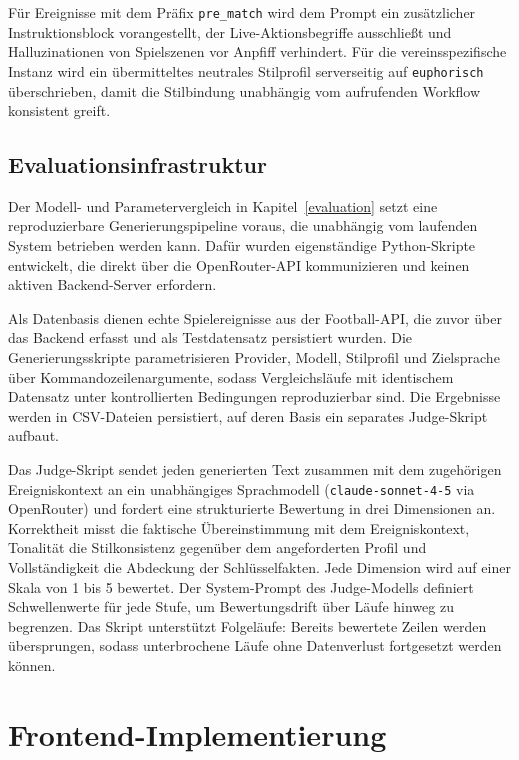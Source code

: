 Für Ereignisse mit dem Präfix \texttt{pre\_match} wird dem Prompt ein zusätzlicher Instruktionsblock vorangestellt, der Live-Aktionsbegriffe ausschließt und Halluzinationen von Spielszenen vor Anpfiff verhindert. Für die vereinsspezifische Instanz wird ein übermitteltes neutrales Stilprofil serverseitig auf \texttt{euphorisch} überschrieben, damit die Stilbindung unabhängig vom aufrufenden Workflow konsistent greift.

\subsection{Evaluationsinfrastruktur}\label{evaluationsinfrastruktur}

Der Modell- und Parametervergleich in Kapitel~\ref{evaluation} setzt eine reproduzierbare Generierungspipeline voraus, die unabhängig vom laufenden System betrieben werden kann. Dafür wurden eigenständige Python-Skripte entwickelt, die direkt über die OpenRouter-API kommunizieren und keinen aktiven Backend-Server erfordern.

Als Datenbasis dienen echte Spielereignisse aus der Football-API, die zuvor über das Backend erfasst und als Testdatensatz persistiert wurden. Die Generierungsskripte parametrisieren Provider, Modell, Stilprofil und Zielsprache über Kommandozeilenargumente, sodass Vergleichsläufe mit identischem Datensatz unter kontrollierten Bedingungen reproduzierbar sind. Die Ergebnisse werden in CSV-Dateien persistiert, auf deren Basis ein separates Judge-Skript aufbaut.

Das Judge-Skript sendet jeden generierten Text zusammen mit dem zugehörigen Ereigniskontext an ein unabhängiges Sprachmodell (\texttt{claude-sonnet-4-5} via OpenRouter) und fordert eine strukturierte Bewertung in drei Dimensionen an. Korrektheit misst die faktische Übereinstimmung mit dem Ereigniskontext, Tonalität die Stilkonsistenz gegenüber dem angeforderten Profil und Vollständigkeit die Abdeckung der Schlüsselfakten. Jede Dimension wird auf einer Skala von 1 bis 5 bewertet. Der System-Prompt des Judge-Modells definiert Schwellenwerte für jede Stufe, um Bewertungsdrift über Läufe hinweg zu begrenzen. Das Skript unterstützt Folgeläufe: Bereits bewertete Zeilen werden übersprungen, sodass unterbrochene Läufe ohne Datenverlust fortgesetzt werden können.

\section{Frontend-Implementierung}\label{frontend-implementierung}

